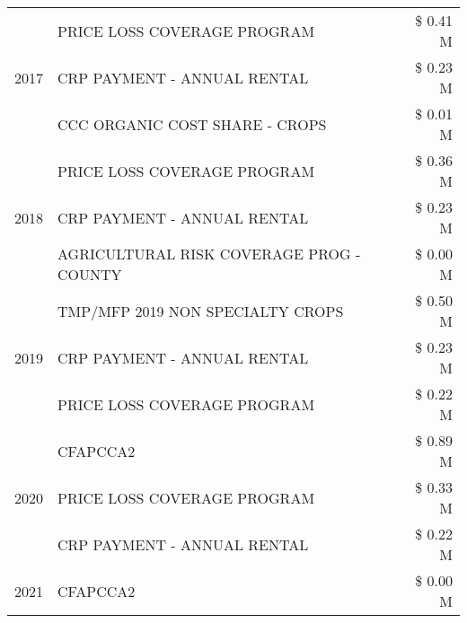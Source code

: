 \begin{tabular}{llr}
\cline{1-3}
\multirow[t]{3}{*}{2017} & PRICE LOSS COVERAGE PROGRAM & \$ 0.41 M \\
 & CRP PAYMENT - ANNUAL RENTAL & \$ 0.23 M \\
 & CCC ORGANIC COST SHARE - CROPS & \$ 0.01 M \\
\cline{1-3}
\multirow[t]{3}{*}{2018} & PRICE LOSS COVERAGE PROGRAM & \$ 0.36 M \\
 & CRP PAYMENT - ANNUAL RENTAL & \$ 0.23 M \\
 & AGRICULTURAL RISK COVERAGE PROG - COUNTY & \$ 0.00 M \\
\cline{1-3}
\multirow[t]{3}{*}{2019} & TMP/MFP 2019 NON SPECIALTY CROPS & \$ 0.50 M \\
 & CRP PAYMENT - ANNUAL RENTAL & \$ 0.23 M \\
 & PRICE LOSS COVERAGE PROGRAM & \$ 0.22 M \\
\cline{1-3}
\multirow[t]{3}{*}{2020} & CFAPCCA2 & \$ 0.89 M \\
 & PRICE LOSS COVERAGE PROGRAM & \$ 0.33 M \\
 & CRP PAYMENT - ANNUAL RENTAL & \$ 0.22 M \\
\cline{1-3}
2021 & CFAPCCA2 & \$ 0.00 M \\
\cline{1-3}
\bottomrule
\end{tabular}
